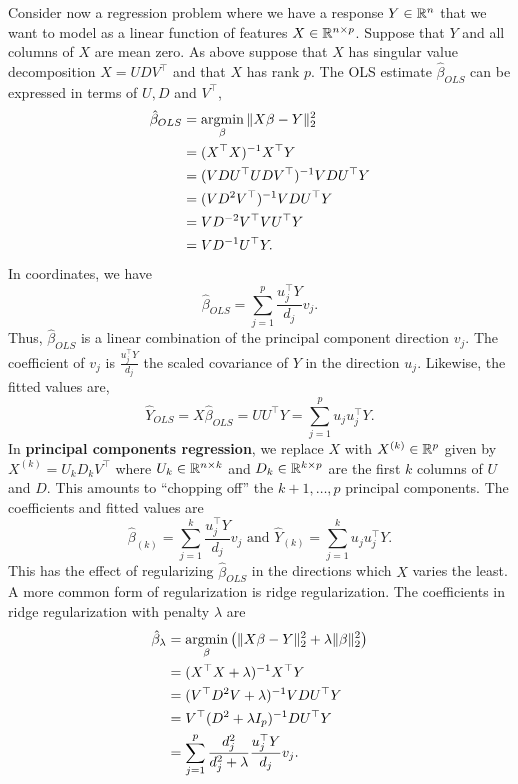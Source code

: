 Consider now a regression problem where we have a response $Y \in \mathbb{R}^n$ that we want to model as a linear function of features $X \in \mathbb{R}^{n \times p}$. Suppose that $Y$ and all columns of $X$ are mean zero. As above suppose that $X$ has singular value decomposition $X=UDV^\top$ and that $X$ has rank $p$. The OLS estimate $\hat{\beta}_{OLS}$ can be expressed in terms of $U,D$ and $V^\top$,
\begin{align*}
    \hat{\beta}_{OLS}&=\operatorname*{argmin}_{\beta} \Vert X\beta - Y \Vert_2^2 \\
    &=(X^\top X)^{-1}X^\top Y\\
    &=(VDU^\top U D V^\top)^{-1}V DU^\top Y\\
    &=(VD^2 V^\top)^{-1} VDU^\top Y\\
    &=VD^{-2}V^\top VU^\top Y\\
    &=VD^{-1}U^\top Y.
\end{align*}
In coordinates, we have
\[\hat{\beta}_{OLS} = \sum_{j=1}^p \frac{u_j^\top Y}{d_j}v_j. \]
Thus, $\hat{\beta}_{OLS}$ is a linear combination of the principal component direction $v_j$. The coefficient of $v_j$ is $\frac{u_j^\top Y}{d_j}$ the scaled covariance of $Y$ in the direction $u_j$. Likewise, the fitted values are,
\[\widehat{Y}_{OLS} = X\hat{\beta}_{OLS} = UU^\top Y =  \sum_{j=1}^p u_ju_j^\top Y. \]
In \textbf{principal components regression}, we replace $X$ with $X^{(k)} \in \mathbb{R}^p$ given by $X^{(k)}= U_k D_k V^\top$ where $U_k \in \mathbb{R}^{n \times k}$ and $D_k \in \mathbb{R}^{k \times p}$ are the first $k$ columns of $U$ and $D$. This amounts to ``chopping off'' the $k+1,\ldots,p$ principal components. The coefficients and fitted values are 
\[\hat{\beta}_{(k)} = \sum_{j=1}^k \frac{u_j^\top Y}{d_j} v_j \text{ and } \hat{Y}_{(k)} = \sum_{j=1}^k u_ju_j^\top Y. \]
This has the effect of regularizing $\hat{\beta}_{OLS}$ in the directions which $X$ varies the least. A more common form of regularization is ridge regularization. The coefficients in ridge regularization with penalty $\lambda$ are
\begin{align*}
    \hat{\beta}_\lambda&=\operatorname*{argmin}_\beta \left(\Vert X \beta - Y \Vert_2^2 + \lambda \Vert \beta\Vert_2^2 \right)\\
    &=(X^\top X + \lambda)^{-1}X^\top Y\\
    &=(V^\top D^2 V + \lambda)^{-1}VDU^\top Y\\
    &=V^\top (D^2+\lambda I_p)^{-1}DU^\top Y\\
    &=\sum_{j=1}^p \frac{d_j^2}{d_j^2+\lambda} \frac{u_j^\top Y}{d_j}v_j.
\end{align*}
